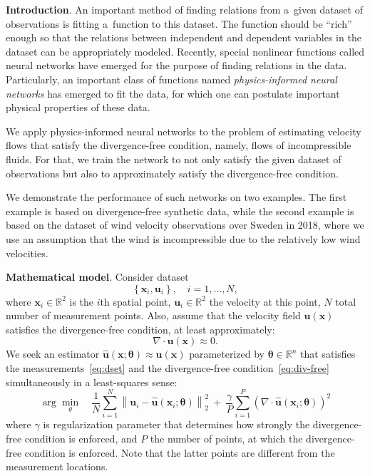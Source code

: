 \documentclass[pamm,a4paper,fleqn]{w-art}
\renewcommand{\vec}[1]{\boldsymbol{#1}}
\newcommand{\R}{\mathbb R}
\newcommand{\norm}[1]{\left\lVert#1\right\rVert}
\begin{document}
\textbf{Introduction}.
An important method of finding relations from a~given dataset of observations
is fitting a~function to this dataset.
The function should be ``rich'' enough so that the relations between independent
and dependent variables in the dataset can be appropriately modeled.
Recently, special nonlinear functions called neural networks have emerged for
the purpose of finding relations in the data. Particularly, an important class
of functions named \emph{physics-informed neural networks} \cite{RaissiEtAl2019}
has emerged to fit the data, for which one can postulate
important physical properties of these data.

We apply physics-informed neural networks to the problem of estimating velocity
flows that satisfy the divergence-free condition, namely, flows of
incompressible fluids.
For that, we train the network to not only satisfy the given dataset of
observations but also to approximately satisfy the divergence-free condition.

We demonstrate the performance of such networks on two examples.
The first example is based on divergence-free synthetic data, while
the second example is based on the dataset of wind velocity observations over
Sweden in 2018, where we use an assumption that the wind is incompressible due
to the relatively low wind velocities.

\textbf{Mathematical model}.
Consider dataset
\begin{equation}
  \label{eq:dset}
  \left\{\vec{x}_i, \vec{u}_i\right\}, \quad i = 1, \dots, N,
\end{equation}
where $\vec{x}_i \in \R^2$ is the $i$th spatial point,
$\vec{u}_i  \in \R^2$ the velocity at this  point,
$N$ total number of measurement points.
Also, assume that the velocity field $\vec u (\vec x)$ satisfies the
divergence-free condition, at least approximately:
\begin{equation}
  \label{eq:div-free}
  \nabla \cdot \vec u (\vec x) \approx 0.
\end{equation}
We seek an estimator $\hat{\vec u} (\vec x; \vec \theta)\approx \vec u(\vec x)$
parameterized by $\vec \theta \in \R^n$ that satisfies
the measurements~\eqref{eq:dset} and the divergence-free
condition~\eqref{eq:div-free} simultaneously in a least-squares sense:
\begin{equation}
  \label{eq:opt-problem}
  \arg \min_\theta \quad
  \frac{1}{N} \sum_{i=1}^N \norm{\vec u_i - \hat{\vec u}(\vec x_i; \vec\theta)}^2_2
  \ + \ 
  \frac{\gamma}{P} \sum_{i=1}^P \left( \nabla \cdot \hat{\vec u}(\vec x_i; \vec\theta)\right)^2
\end{equation}
where 
$\gamma$ is regularization parameter that determines how strongly
the divergence-free condition is enforced,
and $P$ the number of points, at which the divergence-free condition is
enforced. Note that the latter points are different
from the measurement locations.
\end{document}
